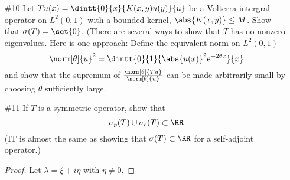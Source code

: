 \documentclass[11pt, oneside]{article}
\begin{document}
\begin{enumerate}
\begin{enumerate}
        \begin{proof}
          
        \end{proof}

      \item[(iii)]
        Show that $\sigma(T_3) = \sigma_r(T_3) = \CC$.

        \begin{proof}
          
        \end{proof}
    \end{enumerate}

  \pagebreak
  \item[\#10]
    Let $Tu(x) = \dintt{0}{x}{K(x, y)u(y)}{u}$ be a Volterra intergral operator
    on $L^2(0, 1)$ with a bounded kernel, $\abs{K(x, y)} \le M$.
    Show that $\sigma(T) = \set{0}$.
    (There are several ways to show that $T$ has no nonzero eigenvalues.
    Here is one approach: Define the equivalent norm on $L^2(0, 1)$
    \[
      \norm[\theta]{u}^2 = \dintt{0}{1}{\abs{u(x)}^2e^{-2\theta x}}{x}
    \]
    and show that the supremum of $\frac{\norm[\theta]{Tu}}{\norm[\theta]{u}}$
    can be made arbitrarily small by choosing $\theta$ sufficiently large.

  \pagebreak
  \item[\#11]
    If $T$ is a symmetric operator, show that
    \[
      \sigma_p(T) \cup \sigma_c(T) \subset \RR
    \]
    (IT is almost the same as showing that $\sigma(T) \subset \RR$ for a
    self-adjoint operator.)

    \begin{proof}
      Let $\lambda = \xi + i \eta$ with $\eta \neq 0$.
    \end{proof}
\end{enumerate}
\end{document}
